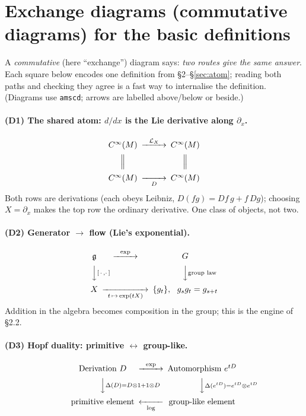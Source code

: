 \documentclass[11pt]{article}
\theoremstyle{definition}
\theoremstyle{remark}
\newcommand{\g}{\mathfrak{g}}
\begin{document}
\section{Exchange diagrams (commutative diagrams) for the basic definitions}
\label{sec:diagrams}

A \emph{commutative} (here ``exchange'') diagram says: \emph{two routes give the same answer}. Each
square below encodes one definition from \S2--\S\ref{sec:atom}; reading both paths and checking they
agree is a fast way to internalise the definition. (Diagrams use \texttt{amscd}; arrows are labelled
above/below or beside.)

\paragraph{(D1) The shared atom: $d/dx$ is the Lie derivative along $\partial_x$.}
\[
\begin{CD}
C^\infty(M) @>{\ \mathcal{L}_X\ }>> C^\infty(M)\\
@| @|\\
C^\infty(M) @>>{\ D\ }> C^\infty(M)
\end{CD}
\]
Both rows are derivations (each obeys Leibniz, $D(fg)=Df\,g+f\,Dg$); choosing $X=\partial_x$ makes the
top row the ordinary derivative. One class of objects, not two.

\paragraph{(D2) Generator $\to$ flow (Lie's exponential).}
\[
\begin{CD}
\g @>{\ \exp\ }>> G\\
@VV{[\,\cdot\,,\cdot\,]}V @VV{\text{group law}}V\\
X @>>{\ t\,\mapsto\,\exp(tX)\ }> \{g_t\},\ \ g_{s}g_{t}=g_{s+t}
\end{CD}
\]
Addition in the algebra becomes composition in the group; this is the engine of \S2.2.

\paragraph{(D3) Hopf duality: primitive $\leftrightarrow$ group-like.}
\[
\begin{CD}
\text{Derivation } D @>{\ \exp\ }>> \text{Automorphism } e^{tD}\\
@VV{\Delta(D)=D\otimes1+1\otimes D}V @VV{\Delta(e^{tD})=e^{tD}\otimes e^{tD}}V\\
\text{primitive element} @<<{\ \log\ }< \text{group-like element}
\end{CD}
\]
\end{document}
